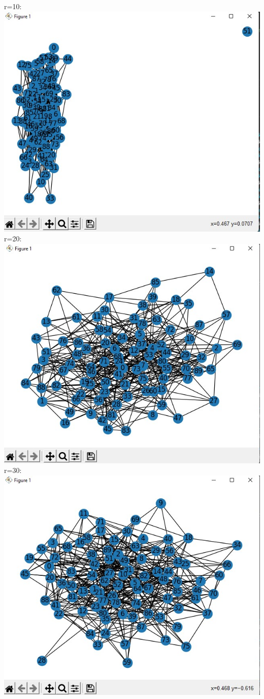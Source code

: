 \documentclass[answers]{exam}
\begin{document}
\begin{questions}
\begin{framed}
r=10:\\\includegraphics[width=10 cm]{sec conf10th.jpg}\\r=20:\\\includegraphics[width=10 cm]{20th sec conf.jpg}\\r=30:\\ \includegraphics[width=10 cm]{30th sec conf.jpg}\\\\

\end{framed}
\end{questions}
\end{document}
